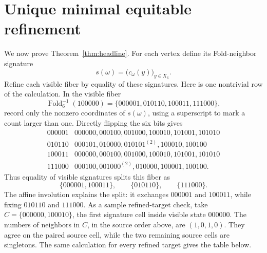 \documentclass[12pt,a4paper]{article}
\theoremstyle{plain}
\theoremstyle{definition}
\numberwithin{equation}{section}
\newcommand{\Fold}{\operatorname{Fold}}
\begin{document}
\section{Unique minimal equitable refinement}\label{sec:repair}
We now prove Theorem~\ref{thm:headline}.  For each vertex define its Fold-neighbor
signature
\[
s(\omega)=\bigl(c_\omega(y)\bigr)_{y\in X_6}.
\]
Refine each visible fiber by equality of these signatures.  Here is one nontrivial row
of the calculation.  In the visible fiber
\[
\Fold_6^{-1}(100000)=\{000001,010110,100011,111000\},
\]
record only the nonzero coordinates of \(s(\omega)\), using a superscript to mark a
count larger than one.  Directly flipping the six bits gives
\[
\begin{array}{c|l}
000001&000000,000100,001000,100010,101001,101010\\
010110&000101,010000,010101^{(2)},100010,100100\\
100011&000000,000100,001000,100010,101001,101010\\
111000&000100,001000^{(2)},010000,100001,100100.
\end{array}
\]
Thus equality of visible signatures splits this fiber as
\[
\{000001,100011\},\qquad \{010110\},\qquad \{111000\}.
\]
The affine involution explains the split: it exchanges \(000001\) and \(100011\), while
fixing \(010110\) and \(111000\).  As a sample refined-target check, take
\(C=\{000000,100010\}\), the first signature cell inside visible state \(000000\).
The numbers of neighbors in \(C\), in the source order above, are \((1,0,1,0)\).
They agree on the paired source cell, while the two remaining source cells are
singletons.  The same calculation for every refined target gives the table below.
\end{document}
